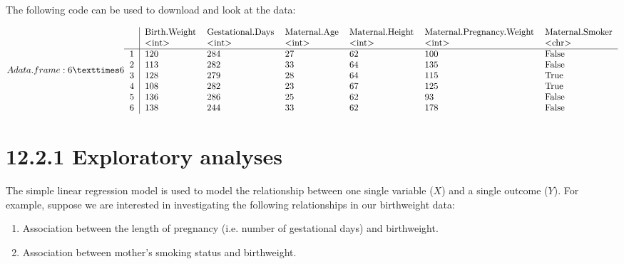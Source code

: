 \documentclass[letterpaper,10pt,english]{jupyterBook}
\begin{document}
\sphinxAtStartPar
The following code can be used to download and look at the data:

\begin{sphinxVerbatim}[commandchars=\\\{\}]
 

\end{sphinxVerbatim}
\begin{equation*}
\begin{split}A data.frame: 6 × 6
\begin{tabular}{r|llllll}
  & Birth.Weight & Gestational.Days & Maternal.Age & Maternal.Height & Maternal.Pregnancy.Weight & Maternal.Smoker\\
  & <int> & <int> & <int> & <int> & <int> & <chr>\\
\hline
	1 & 120 & 284 & 27 & 62 & 100 & False\\
	2 & 113 & 282 & 33 & 64 & 135 & False\\
	3 & 128 & 279 & 28 & 64 & 115 & True \\
	4 & 108 & 282 & 23 & 67 & 125 & True \\
	5 & 136 & 286 & 25 & 62 &  93 & False\\
	6 & 138 & 244 & 33 & 62 & 178 & False\\
\end{tabular}\end{split}
\end{equation*}

\section{12.2.1 Exploratory analyses}
\label{\detokenize{12.c. Linear Regression I:exploratory-analyses}}
\sphinxAtStartPar
The simple linear regression model is used to model the relationship between one single variable (\(X\)) and a single outcome (\(Y\)). For example, suppose we are interested in investigating the following relationships in our birthweight data:
\begin{enumerate}
%
\item {} 
\sphinxAtStartPar
Association between the length of pregnancy (i.e. number of gestational days) and birthweight.

\item {} 
\sphinxAtStartPar
Association between mother’s smoking status and birthweight.

\end{enumerate}
\end{document}
